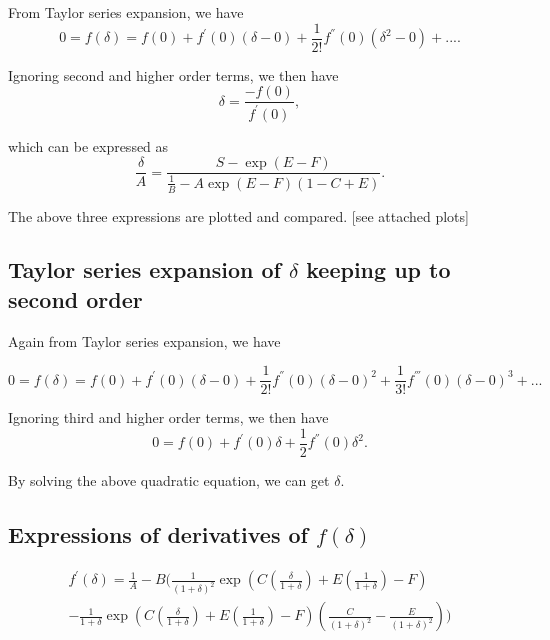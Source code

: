 \documentclass[12pt]{article}
\begin{document}
From Taylor series expansion, we have
\begin{equation}\label{eqn:27}
0=f(\delta)=f(0)+f^{'}(0)(\delta-0)+\frac{1}{2!}f^{''}(0)(\delta^{2}-0)+....
\end{equation}

Ignoring second and higher order terms, we then have
\begin{equation}\label{eqn:28}
\delta=\frac{-f(0)}{f^{'}(0)},
\end{equation}

which can be expressed as
\begin{equation}\label{eqn:29}
\frac{\delta}{A}=\frac{S-\exp(E-F)}{\frac{1}{B}-A \exp(E-F) (1-C+E)}.
\end{equation}

The above three expressions are plotted and compared. [see attached plots]

\subsection{Taylor series expansion of $\delta$ keeping up to second order}

Again from Taylor series expansion, we have

\begin{equation}\label{eqn:30}
0=f(\delta)=f(0)+f^{'}(0)(\delta-0)+\frac{1}{2!}f^{''}(0)(\delta-0)^{2}+ \frac{1}{3!} f^{'''}(0)(\delta-0)^{3}+...
\end{equation}

Ignoring third and higher order terms, we then have
\begin{equation}\label{eqn:31}
0=f(0)+f^{'}(0)\delta+\frac{1}{2}f^{''}(0)\delta^{2}.
\end{equation}

By solving the above quadratic equation, we can get $\delta$.

\subsection{Expressions of derivatives of $f(\delta)$}

\begin{eqnarray}\label{eqn:32}
f^{'}(\delta)=\frac{1}{A}-B(\frac{1}{(1+\delta)^{2}}\exp(C (\frac{\delta}{1+\delta})+E(\frac{1}{1+
\delta})-F) \\ \nonumber
-\frac{1}{1+\delta}\exp(C (\frac{\delta}{1+\delta})+E(\frac{1}{1+\delta})-F)(\frac{C}{(1+\delta)^{2}}-\frac{E}{(1+\delta)^{2}}))
\end{eqnarray}
\end{document}
